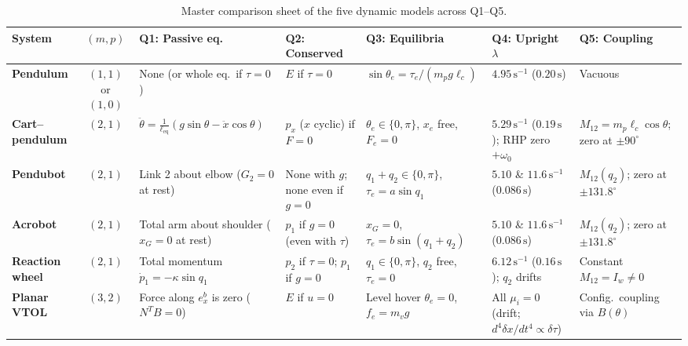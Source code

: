 \documentclass[11pt, a4paper]{article}
\theoremstyle{definition}
\theoremstyle{plain}
\begin{document}
\begin{table}[ht]
\centering
\caption{Master comparison sheet of the five dynamic models across Q1--Q5.}
\label{tab:summary_sheet}
\footnotesize
\renewcommand{\arraystretch}{1.25}
\begin{tabular}{@{}p{2.2cm} c p{2.7cm} p{2.5cm} p{2.5cm} p{2.3cm} p{2.4cm}@{}}
\toprule
\textbf{System} & $(m,p)$ & \textbf{Q1: Passive eq.} & \textbf{Q2: Conserved} & \textbf{Q3: Equilibria} & \textbf{Q4: Upright $\lambda$} & \textbf{Q5: Coupling} \\
\midrule
\textbf{Pendulum} & $(1,1)$ or $(1,0)$ & None (or whole eq.\ if $\tau=0$) & $E$ if $\tau=0$ & $\sin\theta_e = \tau_e/(m_p g \ell_c)$ & $4.95\,\mathrm{s}^{-1}$ ($0.20\,\mathrm{s}$) & Vacuous \\
\textbf{Cart--pendulum} & $(2,1)$ & $\ddot{\theta} = \frac{1}{\ell_{\text{eq}}}(g\sin\theta - \ddot{x}\cos\theta)$ & $p_x$ ($x$ cyclic) if $F=0$ & $\theta_e \in \{0,\pi\}$, $x_e$ free, $F_e=0$ & $5.29\,\mathrm{s}^{-1}$ ($0.19\,\mathrm{s}$); RHP zero $+\omega_0$ & $M_{12} = m_p \ell_c \cos\theta$; zero at $\pm 90^\circ$ \\
\textbf{Pendubot} & $(2,1)$ & Link 2 about elbow ($G_2=0$ at rest) & None with $g$; none even if $g=0$ & $q_1+q_2\in\{0,\pi\}$, $\tau_e=a\sin q_1$ & $5.10$ \& $11.6\,\mathrm{s}^{-1}$ ($0.086\,\mathrm{s}$) & $M_{12}(q_2)$; zero at $\pm 131.8^\circ$ \\
\textbf{Acrobot} & $(2,1)$ & Total arm about shoulder ($x_G=0$ at rest) & $p_1$ if $g=0$ (even with $\tau$) & $x_G = 0$, $\tau_e = b\sin(q_1+q_2)$ & $5.10$ \& $11.6\,\mathrm{s}^{-1}$ ($0.086\,\mathrm{s}$) & $M_{12}(q_2)$; zero at $\pm 131.8^\circ$ \\
\textbf{Reaction wheel} & $(2,1)$ & Total momentum $\dot{p}_1 = -\kappa\sin q_1$ & $p_2$ if $\tau=0$; $p_1$ if $g=0$ & $q_1\in\{0,\pi\}$, $q_2$ free, $\tau_e=0$ & $6.12\,\mathrm{s}^{-1}$ ($0.16\,\mathrm{s}$); $q_2$ drifts & Constant $M_{12} = I_w \neq 0$ \\
\textbf{Planar VTOL} & $(3,2)$ & Force along $e_x^b$ is zero ($N^T B = 0$) & $E$ if $u=0$ & Level hover $\theta_e=0$, $f_e=m_v g$ & All $\mu_i=0$ (drift; $d^4\delta x/dt^4 \propto \delta\tau$) & Config.\ coupling via $B(\theta)$ \\
\bottomrule
\end{tabular}
\end{table}
\end{document}

